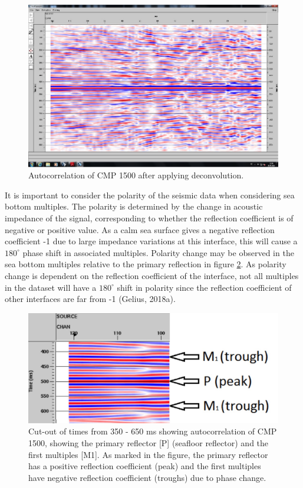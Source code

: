 \documentclass[10pt,a4paper]{article}
\begin{document}
\begin{figure}[H]
\includegraphics[width=\textwidth, trim={0.4cm 0.8cm 0cm 0.5cm},clip]{fig16.jpg}
\caption{Autocorrelation of CMP 1500 after applying deconvolution.}
\label{fig16}
\end{figure}

\noindent It is important to consider the polarity of the seismic data when considering sea bottom multiples. The polarity is determined by the change in acoustic impedance of the signal, corresponding to whether the reflection coefficient is of negative or positive value. As a calm sea surface gives a negative reflection coefficient -1 due to large impedance variations at this interface, this will cause a $180^{\circ}$ phase shift in associated multiples. Polarity change may be observed in the sea bottom multiples relative to the primary reflection in figure \ref{fig17}. As polarity change is dependent on the reflection coefficient of the interface, not all multiples in the dataset will have a $180^{\circ}$ shift in polarity since the reflection coefficient of other interfaces are far from -1 (Gelius, 2018a).


\begin{figure}[H]
\centering
\includegraphics[scale=0.3]{fig17.jpg}
\caption{Cut-out of times from 350 - 650 ms showing autocorrelation of CMP 1500, showing the primary reflector [P] (seafloor reflector) and the first multiples [M1]. As marked in the figure, the primary reflector has a positive reflection coefficient (peak) and the first multiples have negative reflection coefficient (troughs) due to phase change.}
\label{fig17}
\end{figure}
\end{document}
